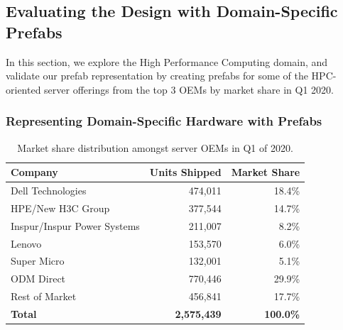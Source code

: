 \documentclass[11pt]{article}
\begin{document}
	\subsection{Evaluating the Design with Domain-Specific Prefabs}
		In this section, we explore the High Performance Computing domain, and validate our prefab representation by creating prefabs for some of the HPC-oriented server offerings from the top 3 OEMs by market share in Q1 2020.
	
		\subsubsection{Representing Domain-Specific Hardware with Prefabs}
			\begin{table}[]
			\centering
				\begin{tabular}{lrr}
				\toprule
				Company                     & Units Shipped      & Market Share     \\ \midrule
				\rowcolor[HTML]{9AFF99} 
				Dell Technologies           & 474,011            & 18.4\%           \\
				\rowcolor[HTML]{9AFF99} 
				HPE/New H3C Group           & 377,544            & 14.7\%           \\
				\rowcolor[HTML]{9AFF99} 
				Inspur/Inspur Power Systems & 211,007            & 8.2\%            \\
				Lenovo                      & 153,570            & 6.0\%            \\
				Super Micro                 & 132,001            & 5.1\%            \\
				ODM Direct                  & 770,446            & 29.9\%           \\
				Rest of Market              & 456,841            & 17.7\%           \\ \midrule
				\textbf{Total}              & \textbf{2,575,439} & \textbf{100.0\%} \\ \bottomrule
				\end{tabular}
			\caption[Market share distribution amongst server OEMs in Q1 of 2020]{Market share distribution amongst server OEMs in Q1 of 2020.}
			\label{tab:1}
			\end{table}
\end{document}
